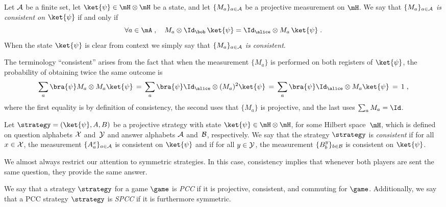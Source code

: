 \begin{definition}
  \label{def:consistent-measurement}
  Let $\cal{A}$ be a finite set, let $\ket{\psi} \in \mH \otimes \mH$ be a
  state, and let $\{ M_a \}_{a \in \cal{A}}$ be a projective measurement on
  $\mH$.
  We say that \emph{$\{M_a\}_{a \in \cal{A}}$ is consistent on $\ket{\psi}$} if
  and only if
  \begin{equation*}
    \forall a \in \mA\;,\quad M_a \otimes \Id_\bob\, \ket{\psi}
    = \Id_\alice \otimes M_a\, \ket{\psi}\;.
  \end{equation*}
	When the state $\ket{\psi}$ is clear from context we simply say that \emph{$\{M_a\}_{a \in \cal{A}}$ is consistent}.
\end{definition}

The terminology ``consistent'' arises from the fact that when the measurement $\{M_a\}$ is performed on both registers of $\ket{\psi}$, the probability of obtaining twice the same outcome is 
\[ \sum_a \bra{\psi} M_a \otimes M_a \ket{\psi}\,=\, \sum_a \bra{\psi} \Id_\alice \otimes (M_a)^2 \ket{\psi} \,=\, \sum_a \bra{\psi} \Id_\alice \otimes M_a \ket{\psi} \,=\,1\;,\]
where the first equality is by definition of consistency, the second uses that $\{M_a\}$ is projective, and the last uses $\sum_a M_a=\Id$. 

\begin{definition}
  \label{def:consistent-strategy}
	Let $\strategy = (\ket{\psi}, A, B)$ be a projective strategy with state
  $\ket{\psi} \in \mH \otimes \mH$, for some Hilbert space~$\mH$, which is
  defined on question alphabets $\cal{X}$ and~$\cal{Y}$ and answer alphabets
  $\cal{A}$ and~$\cal{B}$, respectively.
  We say that the strategy $\strategy$ is \emph{consistent} if for all $x \in
  \cal{X}$, the measurement $\{A^x_a\}_{a \in \cal{A}}$ is consistent on
  $\ket{\psi}$ and if for all $y \in \cal{Y}$, the measurement $\{B^y_b\}_{b \in
    \cal{B}}$ is consistent on $\ket{\psi}$.
\end{definition}

We almost always restrict our attention to symmetric strategies. In this case, consistency implies that whenever both players are sent the same question, they provide the same answer. 

\begin{definition}
  \label{def:spcc}
  We say that a strategy $\strategy$ for a game $\game$ is \emph{PCC} if it is projective, consistent, and commuting for $\game$.
  Additionally, we say that a PCC strategy $\strategy$ is \emph{SPCC} if it is furthermore symmetric.
\end{definition}


